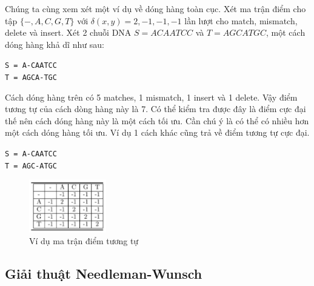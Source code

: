 Chúng ta cùng xem xét một ví dụ về dóng hàng toàn cục. Xét ma trận điểm cho tập 
$\{-, A, C, G, T\}$ với $\delta(x, y) = 2, -1, -1, -1$ lần lượt cho match, mismatch, 
delete và insert. Xét 2 chuỗi DNA $S = ACAATCC$ và $T = AGCATGC$, một cách dóng hàng
khả dĩ như sau:
\begin{center}
    \lstinline{S = A-CAATCC} \\
    \lstinline{T = AGCA-TGC}
\end{center}
Cách dóng hàng trên có 5 matches, 1 mismatch, 1 insert và 1 delete. Vậy điểm tương tự của 
cách dòng hàng này là 7. Có thể kiểm tra được đây là điểm cực đại thế nên cách dóng hàng
này là một cách tối ưu. Cần chú ý là có thể có nhiều hơn một cách dóng hàng tối ưu. 
Ví dụ 1 cách khác cũng trả về điểm tương tự cực đại.
\begin{center}
    \lstinline{S = A-CAATCC} \\
    \lstinline{T = AGC-ATGC}
\end{center}

\begin{figure}[H] %
    \centering %
    \includegraphics[width=0.3\textwidth]{./assets/score_matrix.png} 
    \caption{Ví dụ ma trận điểm tương tự} %
\end{figure}

\subsection{Giải thuật Needleman-Wunsch}
